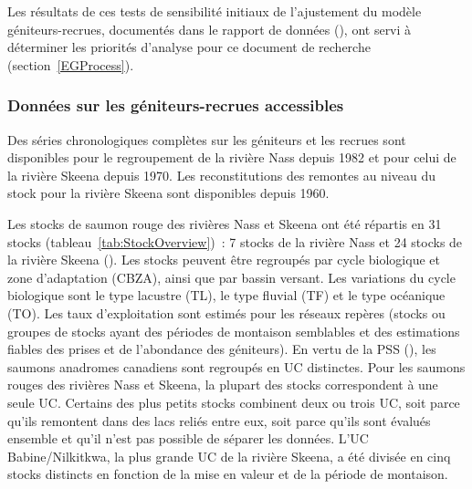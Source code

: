 \documentclass[french,11pt]{book}
\begin{document}
Les résultats de ces tests de sensibilité initiaux de l'ajustement du modèle géniteurs-recrues, documentés dans le rapport de données (), ont servi à déterminer les priorités d'analyse pour ce document de recherche (section~\ref{EGProcess}).

\subsubsection{Données sur les géniteurs-recrues accessibles}\label{AvailableSRData}

Des séries chronologiques complètes sur les géniteurs et les recrues sont disponibles pour le regroupement de la rivière Nass depuis 1982 et pour celui de la rivière Skeena depuis 1970. Les reconstitutions des remontes au niveau du stock pour la rivière Skeena sont disponibles depuis 1960.

Les stocks de saumon rouge des rivières Nass et Skeena ont été répartis en 31 stocks (tableau~\ref{tab:StockOverview})~: 7 stocks de la rivière Nass et 24 stocks de la rivière Skeena (). Les stocks peuvent être regroupés par cycle biologique et zone d'adaptation (CBZA), ainsi que par bassin versant. Les variations du cycle biologique sont le type lacustre (TL), le type fluvial (TF) et le type océanique (TO). Les taux d'exploitation sont estimés pour les réseaux repères (stocks ou groupes de stocks ayant des périodes de montaison semblables et des estimations fiables des prises et de l'abondance des géniteurs). En vertu de la PSS (), les saumons anadromes canadiens sont regroupés en UC distinctes. Pour les saumons rouges des rivières Nass et Skeena, la plupart des stocks correspondent à une seule UC. Certains des plus petits stocks combinent deux ou trois UC, soit parce qu'ils remontent dans des lacs reliés entre eux, soit parce qu'ils sont évalués ensemble et qu'il n'est pas possible de séparer les données. L'UC Babine/Nilkitkwa, la plus grande UC de la rivière Skeena, a été divisée en cinq stocks distincts en fonction de la mise en valeur et de la période de montaison.
\end{document}
